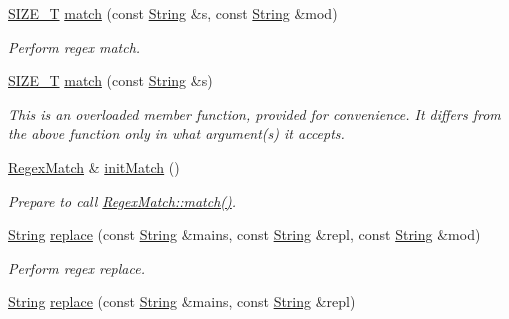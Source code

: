 \begin{DoxyCompactItemize}
\hyperlink{namespacejpcre2_a2aac465ddcb123560c7c8215dd69246c}{S\+I\+Z\+E\+\_\+T} \hyperlink{classjpcre2_1_1Regex_ab93775a93a0a537d09b9e9ab4a5a3894}{match} (const \hyperlink{namespacejpcre2_a91f03070152fb228bc116c5a737f1d16}{String} \&s, const \hyperlink{namespacejpcre2_a91f03070152fb228bc116c5a737f1d16}{String} \&mod)
\begin{DoxyCompactList}\small\item\em Perform regex match. \end{DoxyCompactList}\item 
\hyperlink{namespacejpcre2_a2aac465ddcb123560c7c8215dd69246c}{S\+I\+Z\+E\+\_\+T} \hyperlink{classjpcre2_1_1Regex_a9ffbb6aa54cb97125f1b4211bc1d09a5}{match} (const \hyperlink{namespacejpcre2_a91f03070152fb228bc116c5a737f1d16}{String} \&s)
\begin{DoxyCompactList}\small\item\em This is an overloaded member function, provided for convenience. It differs from the above function only in what argument(s) it accepts. \end{DoxyCompactList}\item 
\hyperlink{classjpcre2_1_1RegexMatch}{Regex\+Match} \& \hyperlink{classjpcre2_1_1Regex_a519b0915bf1163c6ce6a4d674b30cfcd}{init\+Match} ()
\begin{DoxyCompactList}\small\item\em Prepare to call \hyperlink{classjpcre2_1_1RegexMatch_a5868aef3a146594ea1ebef34d122bb33}{Regex\+Match\+::match()}. \end{DoxyCompactList}\item 
\hyperlink{namespacejpcre2_a91f03070152fb228bc116c5a737f1d16}{String} \hyperlink{classjpcre2_1_1Regex_ac592ce7a5e4210ed5f90a0105b1f2981}{replace} (const \hyperlink{namespacejpcre2_a91f03070152fb228bc116c5a737f1d16}{String} \&mains, const \hyperlink{namespacejpcre2_a91f03070152fb228bc116c5a737f1d16}{String} \&repl, const \hyperlink{namespacejpcre2_a91f03070152fb228bc116c5a737f1d16}{String} \&mod)
\begin{DoxyCompactList}\small\item\em Perform regex replace. \end{DoxyCompactList}\item 
\hyperlink{namespacejpcre2_a91f03070152fb228bc116c5a737f1d16}{String} \hyperlink{classjpcre2_1_1Regex_addd7c21abd0f4cf6c532a7602cfb5835}{replace} (const \hyperlink{namespacejpcre2_a91f03070152fb228bc116c5a737f1d16}{String} \&mains, const \hyperlink{namespacejpcre2_a91f03070152fb228bc116c5a737f1d16}{String} \&repl)

\end{DoxyCompactItemize}
